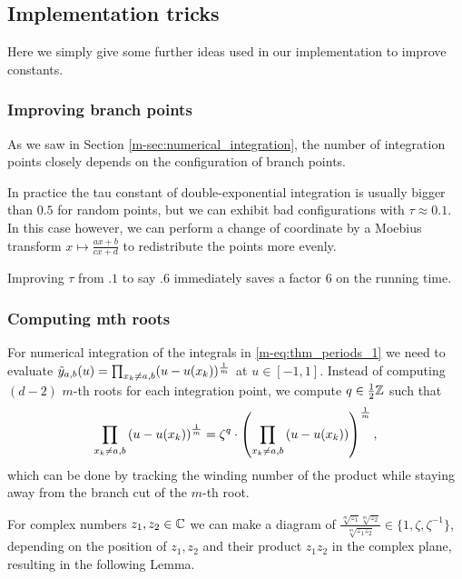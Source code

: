 \documentclass[main.tex]{subfiles}
\begin{document}
   \subsection{Implementation tricks}

   Here we simply give some further ideas used in our implementation to improve constants.

   \subsubsection{Improving branch points}

   As we saw in Section \ref{m-sec:numerical_integration}, the number of integration points
   closely depends on the configuration of branch points.

   In practice the tau constant of double-exponential integration is usually bigger than $0.5$
   for random points, but we can exhibit bad configurations with $τ\approx 0.1$. In this case
   however, we can perform a change of coordinate by a Moebius transform
   $x\mapsto \frac{ax+b}{cx+d}$ to redistribute the points more evenly.

   Improving $τ$ from $.1$ to say $.6$ immediately saves a factor $6$ on the running time.

  \subsubsection{Computing mth roots}
  \label{sec:computingroots}

  For numerical integration of the integrals in \eqref{m-eq:thm_periods_1}
  we need to evaluate $\tilde{y}_{a,b}(u) = \prod_{x_k \ne a,b} (u-u(x_k))^{\frac{1}{m}}$ at $u
  \in [-1,1]$. Instead of computing $(d-2)$ $m$-th roots for each
  integration point, we compute $q \in \frac12\mathbb{Z}$ such that $$\prod_{x_k \ne a,b}
  \left(u - u(x_k) \right)^{\frac{1}{m}} = \zeta^q \cdot \left( \prod_{x_k \ne a,b}
  \left( u - u(x_k) \right) \right)^{\frac{1}{m}} ,$$ which can be done by tracking
  the winding number of the product while staying away from the branch cut
  of the $m$-th root.

  For complex numbers $z_1,z_2 \in \mathbb{C}$ we can make a diagram of
  $\frac{\sqrt[m]{z_1}\sqrt[m]{z_2}}{\sqrt[m]{z_1z_2}} \in \{ 1, \zeta,
  \zeta^{-1} \}$, depending on the position of $z_1,z_2$ and their product
  $z_1z_2$ in the complex plane, resulting in the following Lemma.
\end{document}
